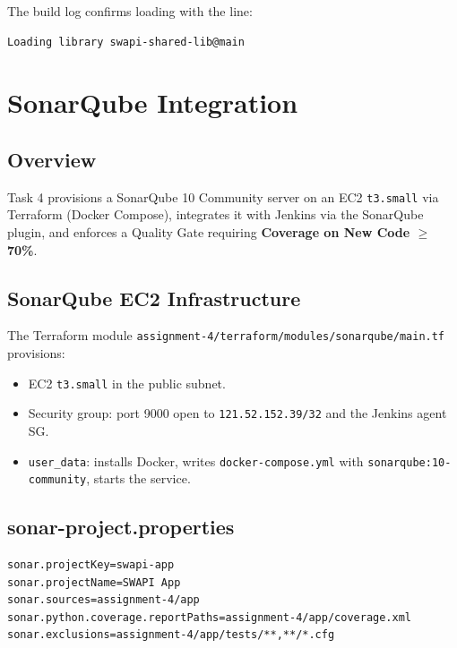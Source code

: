 \documentclass[12pt,a4paper]{article}
\begin{document}
The build log confirms loading with the line:
\begin{verbatim}
Loading library swapi-shared-lib@main
\end{verbatim}

\newpage
\section{SonarQube Integration}

\subsection{Overview}
Task 4 provisions a SonarQube 10 Community server on an EC2 \texttt{t3.small}
via Terraform (Docker Compose), integrates it with Jenkins via the SonarQube
plugin, and enforces a Quality Gate requiring \textbf{Coverage on New Code $\geq$ 70\%}.

\subsection{SonarQube EC2 Infrastructure}

The Terraform module \texttt{assignment-4/terraform/modules/sonarqube/main.tf}
provisions:
\begin{itemize}[leftmargin=*]
  \item EC2 \texttt{t3.small} in the public subnet.
  \item Security group: port 9000 open to \texttt{121.52.152.39/32} and the Jenkins agent SG.
  \item \texttt{user\_data}: installs Docker, writes \texttt{docker-compose.yml} with
        \texttt{sonarqube:10-community}, starts the service.
\end{itemize}

\subsection{sonar-project.properties}

\begin{lstlisting}[language=bash, caption={sonar-project.properties}]
sonar.projectKey=swapi-app
sonar.projectName=SWAPI App
sonar.sources=assignment-4/app
sonar.python.coverage.reportPaths=assignment-4/app/coverage.xml
sonar.exclusions=assignment-4/app/tests/**,**/*.cfg
\end{lstlisting}
\end{document}
